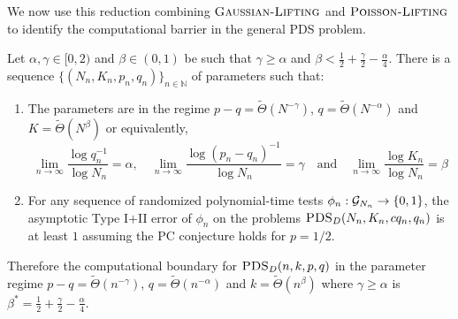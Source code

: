 We now use this reduction combining $\textsc{Gaussian-Lifting}$ and $\textsc{Poisson-Lifting}$ to identify the computational barrier in the general PDS problem.

\begin{theorem}
Let $\alpha, \gamma \in [0, 2)$ and $\beta \in (0, 1)$ be such that $\gamma \ge \alpha$ and $\beta < \frac{1}{2} + \frac{\gamma}{2} - \frac{\alpha}{4}$. There is a sequence $\{ (N_n, K_n, p_n, q_n) \}_{n \in \mathbb{N}}$ of parameters such that:
\begin{enumerate}
\item The parameters are in the regime $p - q = \tilde{\Theta}(N^{-\gamma})$, $q = \tilde{\Theta}(N^{-\alpha})$ and $K = \tilde{\Theta}(N^\beta)$ or equivalently,
$$\lim_{n \to \infty} \frac{\log q_n^{-1}}{\log N_n} = \alpha, \quad \lim_{n \to \infty} \frac{\log (p_n - q_n)^{-1}}{\log N_n} = \gamma \quad \text{and} \quad \lim_{n \to \infty} \frac{\log K_n}{\log N_n} = \beta$$
\item For any sequence of randomized polynomial-time tests $\phi_n : \mathcal{G}_{N_n} \to \{0, 1\}$, the asymptotic Type I$+$II error of $\phi_n$ on the problems $\textsc{PDS}_D(N_n, K_n, cq_n, q_n)$ is at least $1$ assuming the PC conjecture holds for $p = 1/2$.
\end{enumerate}
Therefore the computational boundary for $\textsc{PDS}_D(n, k, p, q)$ in the parameter regime $p - q = \tilde{\Theta}(n^{-\gamma})$, $q = \tilde{\Theta}(n^{-\alpha})$ and $k = \tilde{\Theta}(n^\beta)$ where $\gamma \ge \alpha$ is $\beta^* = \frac{1}{2} + \frac{\gamma}{2} - \frac{\alpha}{4}$.
\end{theorem}

